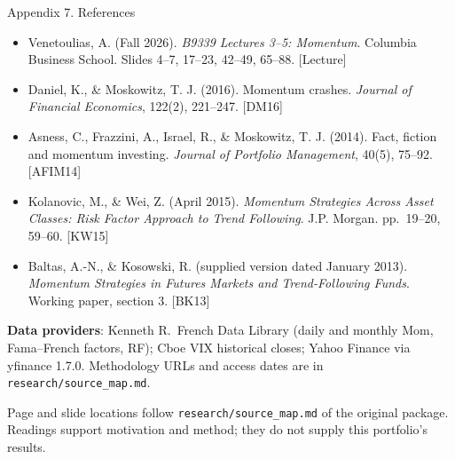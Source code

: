 \documentclass[aspectratio=169,11pt]{beamer}
\newcommand{\src}[1]{\par\vfill{\scriptsize\color{muted}\sloppy #1\par}\vskip0.05cm}
\newcommand{\rcite}[1]{{\color{muted}[#1]}}
\begin{document}
\begin{frame}[t]{Appendix 7. References}
\footnotesize
\begin{itemize}\itemsep3pt
\item[] Venetoulias, A. (Fall 2026). \emph{B9339 Lectures 3--5: Momentum}. Columbia Business School. Slides 4--7, 17--23, 42--49, 65--88. \rcite{Lecture}
\item[] Daniel, K., \& Moskowitz, T. J. (2016). Momentum crashes. \emph{Journal of Financial Economics}, 122(2), 221--247. \rcite{DM16}
\item[] Asness, C., Frazzini, A., Israel, R., \& Moskowitz, T. J. (2014). Fact, fiction and momentum investing. \emph{Journal of Portfolio Management}, 40(5), 75--92. \rcite{AFIM14}
\item[] Kolanovic, M., \& Wei, Z. (April 2015). \emph{Momentum Strategies Across Asset Classes: Risk Factor Approach to Trend Following}. J.P. Morgan. pp.\ 19--20, 59--60. \rcite{KW15}
\item[] Baltas, A.-N., \& Kosowski, R. (supplied version dated January 2013). \emph{Momentum Strategies in Futures Markets and Trend-Following Funds}. Working paper, section 3. \rcite{BK13}
\end{itemize}
\vskip0.2cm
\textbf{Data providers}: Kenneth R.\ French Data Library (daily and monthly Mom, Fama--French factors, RF); Cboe VIX historical closes; Yahoo Finance via yfinance 1.7.0. Methodology URLs and access dates are in \texttt{research/source\_map.md}.
\src{Page and slide locations follow \texttt{research/source\_map.md} of the original package. Readings support motivation and method; they do not supply this portfolio's results.}
\end{frame}
\end{document}
